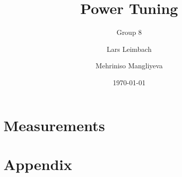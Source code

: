 \documentclass[
  english,        %
  font=times,     %
  twocolumn,      %
]{tumarticle}
\title{Power Tuning}
\subtitle{Group 8}
\author[affil=1, email=lars.leimbach@tum.de]{Lars Leimbach}
\author[affil=1]{Mehriniso Mangliyeva}
\affil[mark=1]{\theDepartmentName, \theUniversityName}
\date{\today}
\begin{document}
\maketitle



% 
\section{Measurements}


\section{Appendix}

\end{document}
